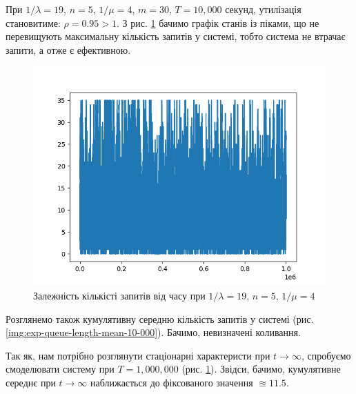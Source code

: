 \documentclass[14pt]{extarticle}
\begin{document}
При \(1 / \lambda = 19\), \(n = 5\), \(1 / \mu = 4\), \(m = 30\), \(T = 10,000\) секунд,
утилізація становитиме: \(\rho = 0.95 > 1\). З рис. \ref{img:exp-first-requests}
бачимо графік станів із піками, що не перевищують максимальну кількість запитів
у системі, тобто система не втрачає запити, а отже є ефективною.

\begin{figure}
  \centering
  \includegraphics{10_000_seconds-requests_in_system.png}\caption{{Залежність кількісті
      запитів від часу при \(1/\lambda = 19\), \(n = 5\),
      \(1/\mu = 4\)}}\label{img:exp-first-requests}
\end{figure}

Розглянемо також кумулятивну середню кількість запитів у системі (рис.
\ref{img:exp-queue-length-mean-10-000}). Бачимо, невизначені коливання.

Так як, нам потрібно розглянути стаціонарні характеристи при \(t \to \infty\),
спробуємо смоделювати систему при \(T = 1,000,000\) (рис.
\ref{img:exp-first-requests}). Звідси, бачимо, кумулятивне середнє при \(t \to \infty\)
наближається до фіксованого значення \(\approxeq 11.5\).
\end{document}
